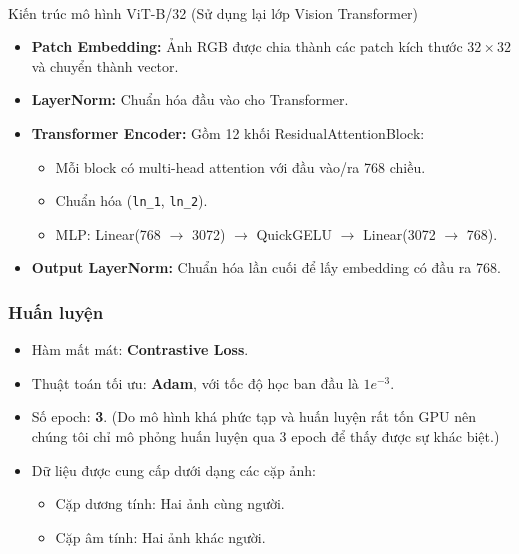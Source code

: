 {\paragraph{}{Kiến trúc mô hình ViT-B/32 (Sử dụng lại lớp Vision Transformer)}
\begin{itemize}
    \item \textbf{Patch Embedding:} Ảnh RGB được chia thành các patch kích thước $32 \times 32$ và chuyển thành vector.
    \item \textbf{LayerNorm:} Chuẩn hóa đầu vào cho Transformer.
    \item \textbf{Transformer Encoder:} Gồm 12 khối ResidualAttentionBlock:
    \begin{itemize}
        \item Mỗi block có multi-head attention với đầu vào/ra 768 chiều.
        \item Chuẩn hóa (\texttt{ln\_1}, \texttt{ln\_2}).
        \item MLP: Linear(768 $\rightarrow$ 3072) $\rightarrow$ QuickGELU $\rightarrow$ Linear(3072 $\rightarrow$ 768).
    \end{itemize}
    \item \textbf{Output LayerNorm:} Chuẩn hóa lần cuối để lấy embedding có đầu ra 768.
\end{itemize}

\subsubsection{Huấn luyện}

\begin{itemize}
    \item Hàm mất mát: \textbf{Contrastive Loss}.
    \item Thuật toán tối ưu: \textbf{Adam}, với tốc độ học ban đầu là $1e^{-3}$.
    \item Số epoch: \textbf{3}. (Do mô hình khá phức tạp và huấn luyện rất tốn GPU nên chúng tôi chỉ mô phỏng huấn luyện qua 3 epoch để thấy được sự khác biệt.) 
    \item Dữ liệu được cung cấp dưới dạng các cặp ảnh:
    \begin{itemize}
        \item Cặp dương tính: Hai ảnh cùng người.
        \item Cặp âm tính: Hai ảnh khác người.
    \end{itemize}
\end{itemize}
}
